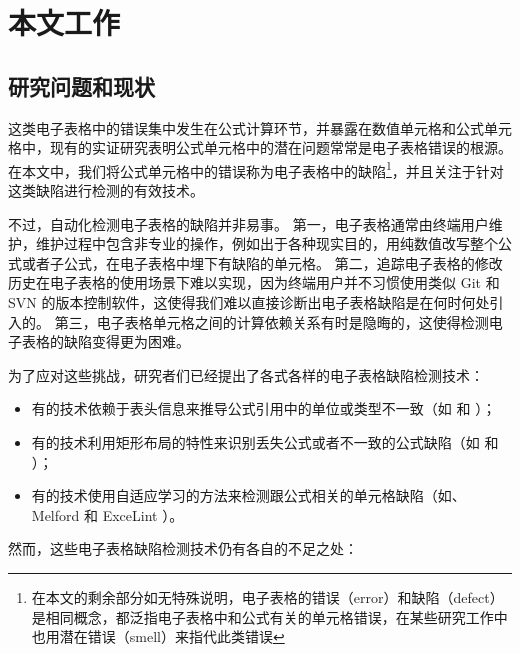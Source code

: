 \section{本文工作}
\subsection{研究问题和现状}
这类电子表格中的错误集中发生在公式计算环节，并暴露在数值单元格和公式单元格中，现有的实证研究\cite{panko2010revising}表明公式单元格中的潜在问题常常是电子表格错误的根源。
在本文中，我们将公式单元格中的错误称为电子表格中的缺陷\footnote{在本文的剩余部分如无特殊说明，电子表格的错误（error）和缺陷（defect）是相同概念，都泛指电子表格中和公式有关的单元格错误，在某些研究工作中也用潜在错误（smell）来指代此类错误}，并且关注于针对这类缺陷进行检测的有效技术。

不过，自动化检测电子表格的缺陷并非易事。
第一，电子表格通常由终端用户维护，维护过程中包含非专业的操作，例如出于各种现实目的，用纯数值改写整个公式或者子公式，在电子表格中埋下有缺陷的单元格。
第二，追踪电子表格的修改历史在电子表格的使用场景下难以实现，因为终端用户并不习惯使用类似 Git 和 SVN 的版本控制软件，这使得我们难以直接诊断出电子表格缺陷是在何时何处引入的。
第三，电子表格单元格之间的计算依赖关系有时是隐晦的，这使得检测电子表格的缺陷变得更为困难。

为了应对这些挑战，研究者们已经提出了各式各样的电子表格缺陷检测技术：

\begin{itemize}
    \item 有的技术依赖于表头信息来推导公式引用中的单位或类型不一致（如\uc \cite{abraham2007ucheck} 和 \di \cite{chambers2009automatic}）；
    \item 有的技术利用矩形布局的特性来识别丢失公式或者不一致的公式缺陷（如\am \cite{dou2014spreadsheet} 和 \ca \cite{dou2017cacheck}）；
    \item 有的技术使用自适应学习的方法来检测跟公式相关的单元格缺陷（如\cu \cite{cheung2016custodes}、Melford\cite{singh2017melford} 和 ExceLint \cite{Barowy2018excelint}）。
\end{itemize}

然而，这些电子表格缺陷检测技术仍有各自的不足之处：

